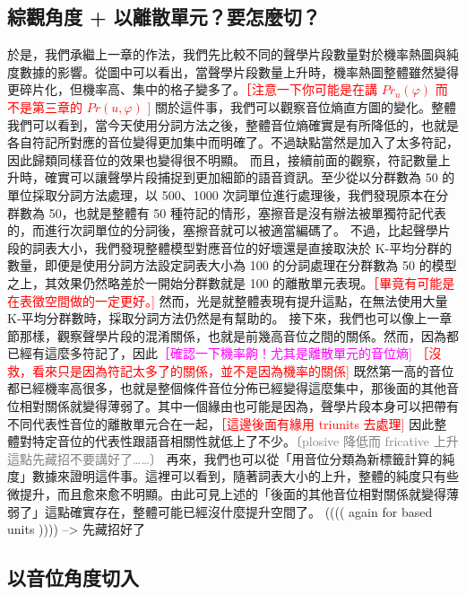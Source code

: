 \subsection{綜觀角度 + 以離散單元？要怎麼切？}
        於是，我們承繼上一章的作法，我們先比較不同的聲學片段數量對於機率熱圖與純度數據的影響。從圖中可以看出，當聲學片段數量上升時，機率熱圖整體雖然變得更碎片化，但機率高、集中的格子變多了。\textcolor{red}{［注意一下你可能是在講 $Pr_u(\varphi)$ 而不是第三章的 $Pr(u, \varphi)$ ] }
        關於這件事，我們可以觀察音位熵直方圖的變化。整體我們可以看到，當今天使用分詞方法之後，整體音位熵確實是有所降低的，也就是各自符記所對應的音位變得更加集中而明確了。不過缺點當然是加入了太多符記，因此歸類同樣音位的效果也變得很不明顯。
        而且，接續前面的觀察，符記數量上升時，確實可以讓聲學片段捕捉到更加細節的語音資訊。至少從以分群數為 50 的單位採取分詞方法處理，以 500、1000 次詞單位進行處理後，我們發現原本在分群數為 50，也就是整體有 50 種符記的情形，塞擦音是沒有辦法被單獨符記代表的，而進行次詞單位的分詞後，塞擦音就可以被適當編碼了。
        不過，比起聲學片段的詞表大小，我們發現整體模型對應音位的好壞還是直接取決於 K-平均分群的數量，即便是使用分詞方法設定詞表大小為 100 的分詞處理在分群數為 50 的模型之上，其效果仍然略差於一開始分群數就是 100 的離散單元表現。\textcolor{red}{［畢竟有可能是在表徵空間做的一定更好。] }然而，光是就整體表現有提升這點，在無法使用大量 K-平均分群數時，採取分詞方法仍然是有幫助的。
        接下來，我們也可以像上一章節那樣，觀察聲學片段的混淆關係，也就是前幾高音位之間的關係。然而，因為都已經有這麼多符記了，因此\textcolor{magenta}{［確認一下機率齁！尤其是離散單元的音位熵] } \textcolor{red}{［沒救，看來只是因為符記太多了的關係，並不是因為機率的關係] }既然第一高的音位都已經機率高很多，也就是整個條件音位分佈已經變得這麼集中，那後面的其他音位相對關係就變得薄弱了。其中一個緣由也可能是因為，聲學片段本身可以把帶有不同代表性音位的離散單元合在一起，\textcolor{red}{［這邊後面有緣用 triunits 去處理] } 因此整體對特定音位的代表性跟語音相關性就低上了不少。\textcolor{gray}{〔plosive 降低而 fricative 上升這點先藏招不要講好了……〕 }
        再來，我們也可以從「用音位分類為新標籤計算的純度」數據來證明這件事。這裡可以看到，隨著詞表大小的上升，整體的純度只有些微提升，而且愈來愈不明顯。由此可見上述的「後面的其他音位相對關係就變得薄弱了」這點確實存在，整體可能已經沒什麼提升空間了。
        (((( again for based units )))) --> 先藏招好了

\subsection{以音位角度切入}

